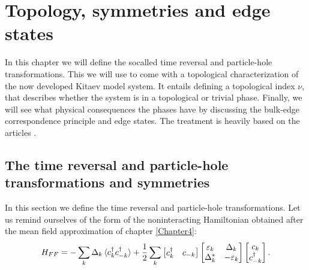 
\chapter{Topology, symmetries and edge states } %

\label{Chapter7} %


In this chapter we will define the socalled time reversal and particle-hole transformations. This we will use to come with a topological characterization of the now developed Kitaev model system. It entails defining a topological index $\nu$, that describes whether the system is in a topological or trivial phase. Finally, we will see what physical consequences the phases have by discussing the bulk-edge correspondence principle and edge states. The treatment is heavily based on the articles \cite{Ludwig.Topology, Chiu.Topology, Alicea}. 

\section{The time reversal and particle-hole transformations and symmetries}
\label{sec.SymmetriesTRandPH}
In this section we define the time reversal and particle-hole transformations. Let us remind ourselves of the form of the noninteracting Hamiltonian obtained after the mean field approximation of chapter \ref{Chapter4}: 
\begin{equation}
H_{FF} = -\sum_k \Delta_k \braket {c^\dagger_k c^\dagger_{-k}} + \frac{1}{2}\sum_{k} \begin{bmatrix} c^\dagger_k & c_{-k} \end{bmatrix} \begin{bmatrix} \varepsilon_k & \Delta_k \\ \Delta^*_k & -\varepsilon_k \end{bmatrix} \begin{bmatrix} c_k \\ c^\dagger_{-k} \end{bmatrix}. \nonumber 
\end{equation}

